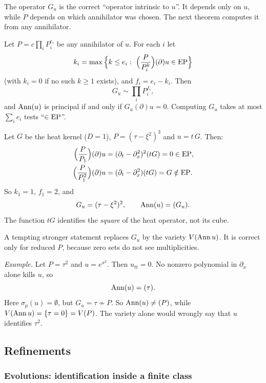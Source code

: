 The operator $G_u$ is the correct ``operator intrinsic to $u$''. It depends only on $u$, while $P$ depends on which annihilator was chosen. The next theorem computes it from any annihilator.

\begin{theorem}\label{thm:intrinsic}
Let $P=c\prod_iP_i^{e_i}$ be any annihilator of $u$. For each $i$ let
\[
k_i=\max\Big\{k\le e_i:\ \Big(\frac{P}{P_i^{k}}\Big)(\partial)u\in\EP\Big\}
\]
(with $k_i=0$ if no such $k\ge1$ exists), and $f_i=e_i-k_i$. Then
\[
G_u\sim\prod_iP_i^{f_i},
\]
and $\operatorname{Ann}(u)$ is principal if and only if $G_u(\partial)u=0$. Computing $G_u$ takes at most $\sum_ie_i$ tests ``$\in\mathrm{EP}$''.

\end{theorem}

\begin{example}
Let $G$ be the heat kernel ($D=1$), $P=(\tau-\xi^2)^3$ and $u=t\,G$. Then:
\begin{align*}
\Big(\frac{P}{P_1}\Big)(\partial)u&=(\partial_t-\partial_x^2)^2(tG)=0\in\mathrm{EP},\\
\Big(\frac{P}{P_1^2}\Big)(\partial)u&=(\partial_t-\partial_x^2)(tG)=G\notin\mathrm{EP} .
\end{align*}
So $k_1=1$, $f_1=2$, and
\[
G_u=(\tau-\xi^2)^2,\qquad \operatorname{Ann}(u)=(G_u).
\]
The function $tG$ identifies the \emph{square} of the heat operator, not its cube.
\end{example}

\begin{caution}[title={Why $G_u$ and not the variety}]
A tempting stronger statement replaces $G_u$ by the variety $V(\operatorname{Ann} u)$. It is correct only for reduced $P$, because zero sets do not see multiplicities.

\emph{Example.} Let $P=\tau^2$ and $u=e^{x^2}$. Then $u_{tt}=0$. No nonzero polynomial in $\partial_x$ alone kills $u$, so
\[
\operatorname{Ann}(u)=(\tau).
\]
Here $\sigma_p(u)=\emptyset$, but $G_u=\tau\not\sim P$. So $\operatorname{Ann}(u)\ne(P)$, while $V(\operatorname{Ann} u)=\{\tau=0\}=V(P)$. The variety alone would wrongly say that $u$ identifies $\tau^2$.
\end{caution}

\subsection{Refinements}

\subsubsection{Evolutions: identification inside a finite class}

